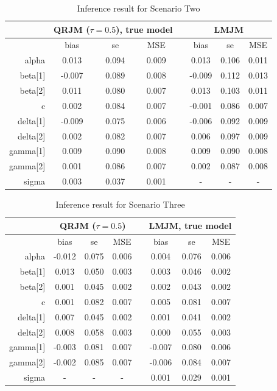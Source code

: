 \documentclass{article}
\begin{document}
\begin{table}[H]
\centering
\caption{Inference result for Scenario Two}
\begin{tabular}{rccccccc}
\hline
& \multicolumn{3}{c}{QRJM ($\tau=0.5$), true model} & & \multicolumn{3}{c}{LMJM}\\
\hline
 & bias & se & MSE & & bias & se & MSE \\
 \cline{2-4}  \cline{6-8}
  alpha & 0.013 & 0.094 & 0.009 & & 0.013 & 0.106 & 0.011 \\
  beta[1] & -0.007 & 0.089 & 0.008 & & -0.009 & 0.112 & 0.013 \\
  beta[2] & 0.011 & 0.080 & 0.007 & & 0.013 & 0.103 & 0.011 \\
  c & 0.002 & 0.084 & 0.007 & & -0.001 & 0.086 & 0.007 \\
  delta[1] & -0.009 & 0.075 & 0.006 & & -0.006 & 0.092 & 0.009 \\
  delta[2] & 0.002 & 0.082 & 0.007 & & 0.006 & 0.097 & 0.009 \\
  gamma[1] & 0.009 & 0.090 & 0.008& & 0.009 & 0.090 & 0.008\\
  gamma[2] & 0.001 & 0.086 & 0.007 & & 0.002 & 0.087 & 0.008 \\
  sigma & 0.003 & 0.037 & 0.001 & & - & - & - \\
   \hline
\end{tabular}
\end{table}





\begin{table}[H]
\centering
\caption{Inference result for Scenario Three}
\begin{tabular}{rccccccc}
\hline
& \multicolumn{3}{c}{QRJM ($\tau=0.5$)} & & \multicolumn{3}{c}{LMJM, true model}\\
\hline
 & bias & se & MSE & & bias & se & MSE \\
 \cline{2-4}  \cline{6-8}
  alpha & -0.012 & 0.075 & 0.006 & & 0.004 & 0.076 & 0.006 \\
  beta[1] & 0.013 & 0.050 & 0.003 & & 0.003 & 0.046 & 0.002 \\
  beta[2] & 0.001 & 0.045 & 0.002 & & 0.002 & 0.043 & 0.002 \\
  c & 0.001 & 0.082 & 0.007& & 0.005 & 0.081 & 0.007 \\
  delta[1] & 0.007 & 0.045 & 0.002 & & 0.001 & 0.041 & 0.002 \\
  delta[2] & 0.008 & 0.058 & 0.003 & & 0.000 & 0.055 & 0.003 \\
  gamma[1] & -0.003 & 0.081 & 0.007 & & -0.007 & 0.080 & 0.006 \\
  gamma[2] & -0.002 & 0.085 & 0.007 & &  -0.006 & 0.084 & 0.007 \\
  sigma & - & - & - & & 0.001 & 0.029 & 0.001 \\
   \hline
\end{tabular}
\end{table}
\end{document}
